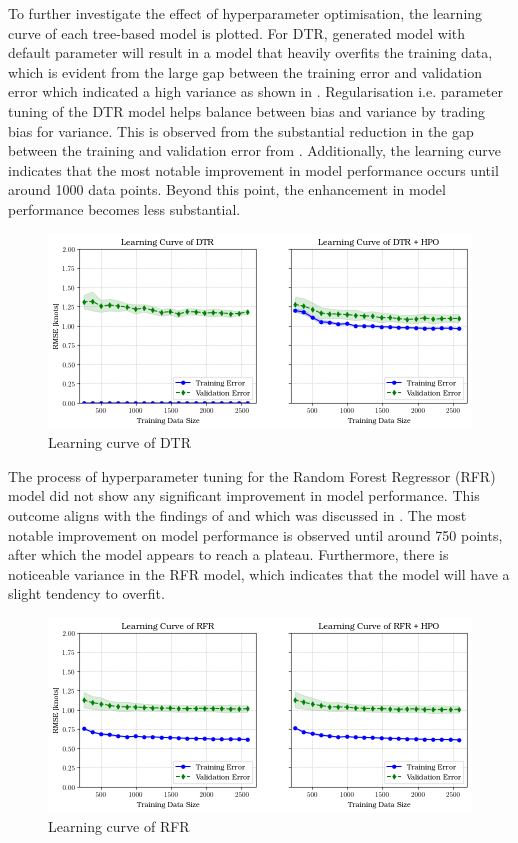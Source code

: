 To further investigate the effect of hyperparameter optimisation, the learning curve of each tree-based model is plotted. For DTR, generated model with default parameter will result in a model that heavily overfits the training data, which is evident from the large gap between the training error and validation error which indicated a high variance as shown in . Regularisation i.e. parameter tuning of the DTR model helps balance between bias and variance by trading bias for variance. This is observed from the substantial reduction in the gap between the training and validation error from . Additionally, the learning curve indicates that the most notable improvement in model performance occurs until around 1000 data points. Beyond this point, the enhancement in model performance becomes less substantial.\\

\begin{figure}[h]
    \centering
        \includegraphics[width=.95\textwidth]{02_figures/learning_curve_dtr.png}
        \caption{Learning curve of DTR}
        \label{fig:learn_curve_DTR_RMSE}
\end{figure}

The process of hyperparameter tuning for the Random Forest Regressor (RFR) model did not show any significant improvement in model performance. This outcome aligns with the findings of   and  which was discussed in . The most notable improvement on model performance is observed until around 750 points, after which the model appears to reach a plateau. Furthermore, there is noticeable variance in the RFR model, which indicates that the model will have a slight tendency to overfit.

\begin{figure}[h]
    \centering
        \includegraphics[width=.95\textwidth]{02_figures/learning_curve_rfr_rmse.png}
        \caption{Learning curve of RFR}
        \label{fig:learn_curve_RFR_RMSE}
\end{figure}


